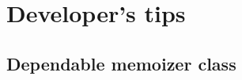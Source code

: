 \documentclass[12pt,fleqn]{report}
\begin{document}
\chapter{Developer's tips}
\section{Dependable memoizer class}
\end{document}
